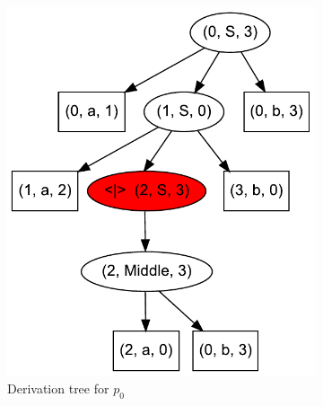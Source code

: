 \begin{figure}[ht]
\begin{center}
\begin{subfigure}[b]{0.3\textwidth}
        \includegraphics[width=\textwidth]{dot/AnBn_2.pdf}
        \caption{Derivation tree for $p_0$}
        \label{tree1}        
    \end{subfigure}
    ~
    \begin{subfigure}[b]{0.3\textwidth}

\end{subfigure}
\end{center}
\end{figure}
